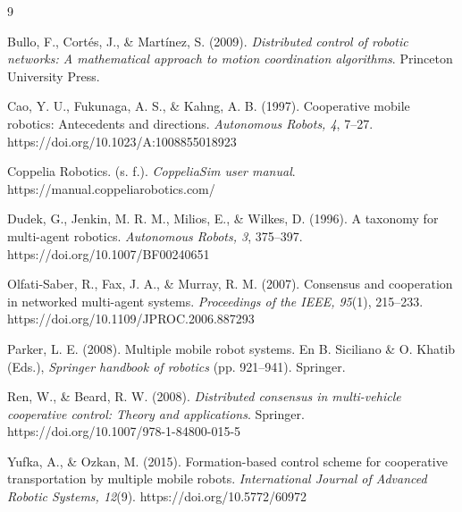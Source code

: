 \documentclass[12pt,a4paper]{article}
\begin{document}
\clearpage
\begin{thebibliography}{9}

Bullo, F., Cortés, J., \& Martínez, S. (2009). \textit{Distributed control of robotic networks: A mathematical approach to motion coordination algorithms}. Princeton University Press.

Cao, Y. U., Fukunaga, A. S., \& Kahng, A. B. (1997). Cooperative mobile robotics: Antecedents and directions. \textit{Autonomous Robots, 4}, 7--27. https://doi.org/10.1023/A:1008855018923

Coppelia Robotics. (s. f.). \textit{CoppeliaSim user manual}. https://manual.coppeliarobotics.com/

Dudek, G., Jenkin, M. R. M., Milios, E., \& Wilkes, D. (1996). A taxonomy for multi-agent robotics. \textit{Autonomous Robots, 3}, 375--397. https://doi.org/10.1007/BF00240651

Olfati-Saber, R., Fax, J. A., \& Murray, R. M. (2007). Consensus and cooperation in networked multi-agent systems. \textit{Proceedings of the IEEE, 95}(1), 215--233. https://doi.org/10.1109/JPROC.2006.887293

Parker, L. E. (2008). Multiple mobile robot systems. En B. Siciliano \& O. Khatib (Eds.), \textit{Springer handbook of robotics} (pp. 921--941). Springer.

Ren, W., \& Beard, R. W. (2008). \textit{Distributed consensus in multi-vehicle cooperative control: Theory and applications}. Springer. https://doi.org/10.1007/978-1-84800-015-5

Yufka, A., \& Ozkan, M. (2015). Formation-based control scheme for cooperative transportation by multiple mobile robots. \textit{International Journal of Advanced Robotic Systems, 12}(9). https://doi.org/10.5772/60972

\end{thebibliography}
\end{document}
